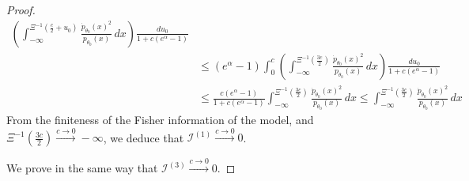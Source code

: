 \documentclass[a4paper, 11pt]{article}
\theoremstyle{definition}
\begin{document}
{\begin{proof}
\begin{align*}
	\left( \int_{-\infty}^{ 	\Xi^{-1}(\frac{c}{2}+u_0) }  \frac{ \dot{p}_{\theta_0}(x)^2 }{ p_{\theta_0}(x) } \,dx \right)
	\frac{du_0}{1+c(e^\alpha-1)} 
	\\
	& \le  \left(e^\alpha-1\right) \int_{0}^{c}  
	\left( \int_{-\infty}^{ 	\Xi^{-1}(\frac{3c}{2}) }  \frac{ \dot{p}_{\theta_0}(x)^2 }{ p_{\theta_0}(x) } \,dx \right)
	\frac{du_0}{1+c(e^\alpha-1)} 
	\\
	& \le  \frac{c  \left(e^\alpha-1\right) }{1+c(e^\alpha-1)}
	\int_{-\infty}^{ \Xi^{-1}(\frac{3c}{2}) }  
	\frac{ \dot{p}_{\theta_0}(x)^2 }{ p_{\theta_0}(x) }\,dx \le 	\int_{-\infty}^{ \Xi^{-1}(\frac{3c}{2}) }  
	\frac{ \dot{p}_{\theta_0}(x)^2 }{ p_{\theta_0}(x) }\,dx
\end{align*}
From the finiteness of the Fisher information of the model, and $\Xi^{-1}(\frac{3c}{2}) \xrightarrow{c\to0} -\infty$, we deduce
that  $	\mathcal{I}^{(1)} \xrightarrow{c\to0} 0$.

We prove in the same way that  $\mathcal{I}^{(3)} \xrightarrow{c\to0} 0$. 


\end{proof}}
\end{document}
